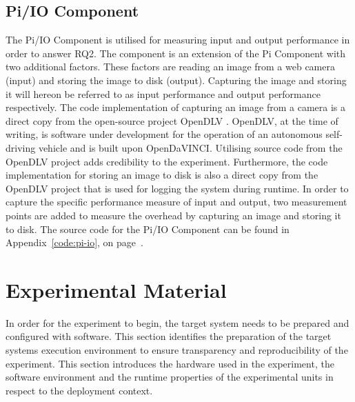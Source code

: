 \subsection{Pi/IO Component}
The Pi/IO Component is utilised for measuring input and output performance in order to answer RQ2. The component is an extension of the Pi Component with two additional factors. These factors are reading an image from a web camera (input) and storing the image to disk (output). Capturing the image and storing it will hereon be referred to as input performance and output performance respectively. The code implementation of capturing an image from a camera is a direct copy from the open-source project OpenDLV \cite{opendlv}. OpenDLV, at the time of writing, is software under development for the operation of an autonomous self-driving vehicle and is built upon OpenDaVINCI. Utilising source code from the OpenDLV project adds credibility to the experiment. Furthermore, the code implementation for storing an image to disk is also a direct copy from the OpenDLV project that is used for logging the system during runtime. In order to capture the specific performance measure of input and output, two measurement points are added to measure the overhead by capturing an image and storing it to disk. The source code for the Pi/IO Component can be found in Appendix~\ref{code:pi-io}, on page~\pageref{code:pi-io}.




\section{Experimental Material}
\label{section:exp-material}
In order for the experiment to begin, the target system needs to be prepared and configured with software. This section identifies the preparation of the target systems execution environment to ensure transparency and reproducibility of the experiment. This section introduces the hardware used in the experiment, the software environment and the runtime properties of the experimental units in respect to the deployment context. 

